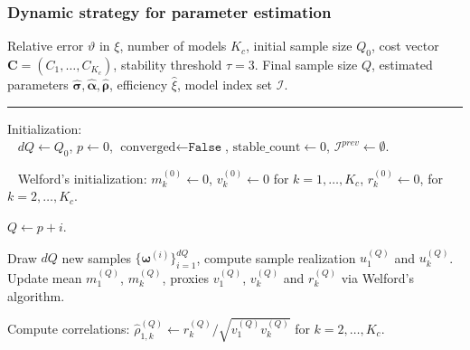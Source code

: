 \documentclass{beamer}
\begin{document}
\begin{frame}[t]
    \frametitle{Dynamic strategy for parameter estimation}
\begin{algorithm}[H]
    {\fontsize{8}{8}\selectfont 
    \begin{algorithmic}[1]

    \REQUIRE Relative error $\vartheta$ in $\xi$, number of models $K_c$, initial sample size $Q_0$, cost vector $\boldsymbol{C} = (C_1, \dots, C_{K_c})$, stability threshold $\tau=3$.
    \ENSURE Final sample size $Q$, estimated parameters $\widehat{\boldsymbol{\sigma}},\widehat{\boldsymbol{\alpha}}, \widehat{\boldsymbol{\rho}}$, efficiency $\widehat{\xi}$, model index set $\mathcal{I}$.
    
    \vspace{1mm}
    \hrule
    \vspace{1mm}
     
    \STATE Initialization:\\

    \STATE\hspace{3mm}\textbullet~ $dQ \gets Q_0$, $p \gets 0$, $\text{converged} \gets \texttt{False}$, $\text{stable}\_\text{count} \gets 0$, $\mathcal{I}^{prev}\gets \emptyset$. %
    
    \STATE\hspace{3mm}\textbullet~  Welford's initialization: $m_k^{(0)} \gets 0$, $v_k^{(0)} \gets 0$ for $k=1,\dots,K_c$,  $r_k^{(0)} \gets 0$, for $k=2,\dots,K_c$. %



    
    
    
        \STATE $Q \gets  p+i$.

        \STATE Draw $dQ$ new samples $\{\boldsymbol{\omega}^{(i)}\}_{i=1}^{dQ}$, compute sample realization $u_{1}^{(Q)}$ and $u_{k}^{(Q)}$.\\

        \STATE Update mean $m_1^{(Q)}$, $m_k^{(Q)}$, proxies $v_1^{(Q)}$, $v_k^{(Q)}$ and $r_{k}^{(Q)}$ via Welford's algorithm.
        
        \ENDFOR
    
    \STATE Compute correlations: $\widehat\rho_{1,k}^{(Q)}\gets r_k^{(Q)}/{\sqrt{v_1^{(Q)}v_k^{(Q)}}}$ for $k=2,\ldots, K_c$. 


\end{algorithmic}}
\end{algorithm}
\end{frame}
\end{document}
